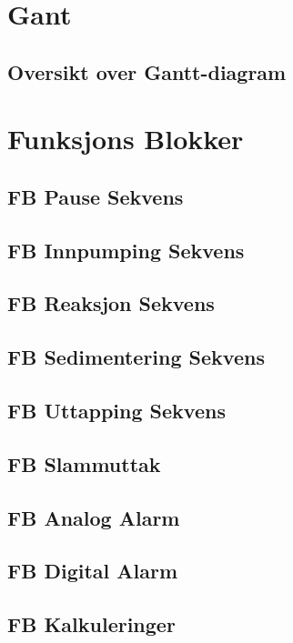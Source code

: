 %  

\chapter{Gant}
\section{Oversikt over Gantt-diagram}

\chapter{Funksjons Blokker}
\section{FB Pause Sekvens}
\section{FB Innpumping Sekvens}
\section{FB Reaksjon Sekvens}
\section{FB Sedimentering Sekvens}
\section{FB Uttapping Sekvens}
\section{FB Slammuttak}
\section{FB Analog Alarm}
\section{FB Digital Alarm}
\section{FB Kalkuleringer}
